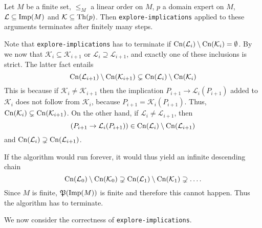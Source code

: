 \begin{Theorem}
  \label{thm:explore-implications-termination}
  Let $M$ be a finite set, $\leq_M$ a linear order on $M$, $p$ a domain expert on $M$,
  $\mathcal{L} \subseteq \operatorname{Imp}(M)$ and $\mathcal{K} \subseteq \operatorname{Th}(p)$.  Then
  \lstinline{explore-implications} applied to these arguments terminates after finitely
  many steps.
\end{Theorem}
\begin{Proof}
  Note that \lstinline{explore-implications} has to terminate if $\operatorname{Cn}(\mathcal{L}_i)
  \setminus \operatorname{Cn}(\mathcal{K}_i) = \emptyset$.  By
   we now that $\mathcal{K}_i
  \subseteq \mathcal{K}_{i+1}$ or $\mathcal{L}_i \supseteq \mathcal{L}_{i+1}$, and exactly
  one of these inclusions is strict.  The latter fact entails
  \begin{equation}
    \label{eq:36}
    \operatorname{Cn}(\mathcal{L}_{i+1}) \setminus \operatorname{Cn}(\mathcal{K}_{i+1}) \subsetneq \operatorname{Cn}(\mathcal{L}_i)
    \setminus \operatorname{Cn}(\mathcal{K}_i)
  \end{equation}
  This is because if $\mathcal{K}_i \neq \mathcal{K}_{i+1}$ then the implication $P_{i+1}
  \to \mathcal{L}_i(P_{i+1})$ added to $\mathcal{K}_{i}$ does not follow from
  $\mathcal{K}_i$, because $P_{i+1} = \mathcal{K}_{i}(P_{i+1})$.  Thus,
  $\operatorname{Cn}(\mathcal{K}_i) \subsetneq \operatorname{Cn}(\mathcal{K}_{i+1})$.  On the other hand, if
  $\mathcal{L}_i \neq \mathcal{L}_{i+1}$, then
  \begin{equation*}
    (P_{i+1} \to \mathcal{L}_i(P_{i+1})) \in \operatorname{Cn}(\mathcal{L}_i) \setminus \operatorname{Cn}(\mathcal{L}_{i+1})
  \end{equation*}
  and $\operatorname{Cn}(\mathcal{L}_i) \supsetneq \operatorname{Cn}(\mathcal{L}_{i+1})$.

  If the algorithm would run forever, it would thus yield an infinite descending chain
  \begin{equation*}
    \operatorname{Cn}(\mathcal{L}_0) \setminus \operatorname{Cn}(\mathcal{K}_0) \supsetneq \operatorname{Cn}(\mathcal{L}_1)
    \setminus \operatorname{Cn}(\mathcal{K}_1) \supsetneq \dots.
  \end{equation*}
  Since $M$ is finite, ${\mathfrak{P}(\operatorname{Imp}(M))}$ is finite and therefore this cannot happen.
  Thus the algorithm has to terminate.
\end{Proof}

We now consider the correctness of \lstinline{explore-implications}.

